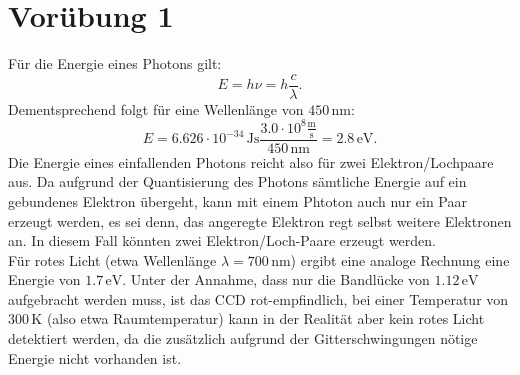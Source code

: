 \documentclass[titlepage]{scrartcl}
\begin{document}
\section{Vorübung 1}
Für die Energie eines Photons gilt: 
\begin{equation}
E = h \nu = h \frac{c}{\lambda}. 
\end{equation}
Dementsprechend folgt für eine Wellenlänge von $450\, \textrm{nm}$: 
\begin{equation}
E = 6.626 \cdot 10^{-34}\, \textrm{Js} \frac{3.0 \cdot 10^8 \frac{\textrm{m}}{\textrm{s}}}{450\, \textrm{nm}} = 2.8\, \textrm{eV}. 
\end{equation}
Die Energie eines einfallenden Photons reicht also für zwei Elektron/Lochpaare aus. 	Da aufgrund der Quantisierung des Photons sämtliche Energie auf ein gebundenes Elektron übergeht, kann mit einem Phtoton auch nur ein Paar erzeugt werden, es sei denn, das angeregte Elektron regt selbst weitere Elektronen an. In diesem Fall könnten zwei Elektron/Loch-Paare erzeugt werden.  \\
Für rotes Licht (etwa Wellenlänge $\lambda = 700\, \textrm{nm} $) ergibt eine analoge Rechnung eine Energie von $1.7\, \textrm{eV} $. Unter der Annahme, dass nur die Bandlücke von $1.12\, \textrm{eV} $ aufgebracht werden muss, ist das CCD rot-empfindlich, bei einer Temperatur von $ 300\, \textrm{K} $ (also etwa Raumtemperatur) kann in der Realität aber kein rotes Licht detektiert werden, da die zusätzlich aufgrund der Gitterschwingungen nötige Energie nicht vorhanden ist.
\end{document}
